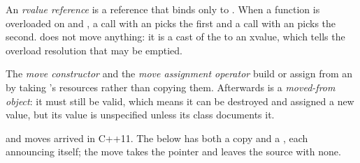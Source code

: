 \begin{definition}\label{def:b2:cpp-copy-move:rvalue-reference}
An \emph{rvalue reference}  is a reference that binds only to . When a
function is overloaded on  and , a call with an  picks the first and a call with an
 picks the second.  does not move anything: it is a cast of the   to an xvalue,
which tells the overload resolution that  may be emptied.
\end{definition}

\begin{definition}\label{def:b2:cpp-copy-move:move}
The \emph{move constructor}  and the \emph{move assignment
operator}  build or assign from an  by taking
's resources rather than copying them. Afterwards  is a \emph{moved-from object}: it must still be valid, which means it can be destroyed and assigned a new value, but its value is
unspecified unless its class documents it.
\end{definition}

 and moves arrived in C++11. The  below has both a copy and a , each
announcing itself; the move takes the pointer and leaves the source with none.

\label{lst:b2:cpp-copy-move:move-demo}

\label{out:b2:cpp-copy-move:move-demo}

